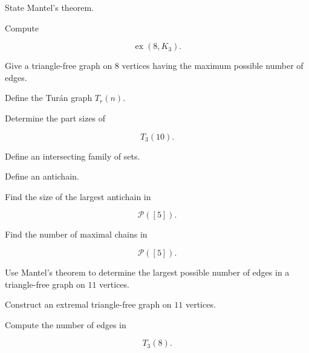 \begin{exercise}[1]
State Mantel's theorem.
\end{exercise}

\begin{exercise}[1]
Compute

\[
\operatorname{ex}(8,K_3).
\]
\end{exercise}

\begin{exercise}[1]
Give a triangle-free graph on \(8\) vertices having the maximum possible
number of edges.
\end{exercise}

\begin{exercise}[1]
Define the Tur\'an graph \(T_r(n)\).
\end{exercise}

\begin{exercise}[1]
Determine the part sizes of

\[
T_3(10).
\]
\end{exercise}

\begin{exercise}[1]
Define an intersecting family of sets.
\end{exercise}

\begin{exercise}[1]
Define an antichain.
\end{exercise}

\begin{exercise}[1]
Find the size of the largest antichain in

\[
\mathcal{P}([5]).
\]
\end{exercise}

\begin{exercise}[1]
Find the number of maximal chains in

\[
\mathcal{P}([5]).
\]
\end{exercise}

\begin{exercise}[2]
Use Mantel's theorem to determine the largest possible number of edges
in a triangle-free graph on \(11\) vertices.
\end{exercise}

\begin{exercise}[2]
Construct an extremal triangle-free graph on \(11\) vertices.
\end{exercise}

\begin{exercise}[2]
Compute the number of edges in

\[
T_3(8).
\]
\end{exercise}

